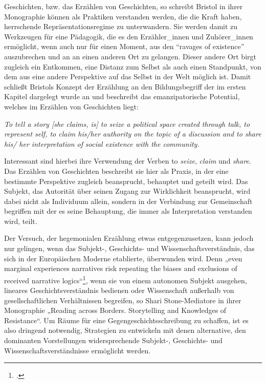   Geschichten, bzw. das Erzählen von Geschichten, so schreibt Bristol in ihrer
  Monographie können als Praktiken verstanden werden, die die Kraft haben,
  herrschende Repräsentationsregime zu unterwandern. Sie werden damit zu
  Werkzeugen für eine Pädagogik, die es den Erzähler\_innen und Zuhörer\_innen
  ermöglicht, wenn auch nur für einen Moment, aus den “ravages of
  existence”\footnotemark {}
  auszubrechen und an an einen anderen Ort zu gelangen. Dieser andere Ort birgt
  zugleich ein Entkommen, eine Distanz zum Selbst  als auch einen Standpunkt,
  von dem aus eine andere Perspektive auf das Selbst in der Welt möglich ist.
  Damit schließt Bristols Konzept der Erzählung an den Bildungsbegriff der im
  ersten Kapitel dargelegt wurde an und beschreibt das emanzipatorische
  Potential, welches im Erzählen von Geschichten liegt:
  \begin{myenv}

\textit{\glqq To tell a story [she claims, is] to seize a political space
  created through talk, to represent self, to claim his/her authority on
  the topic of a discussion and to share his/ her interpretation of social
existence with the community.\grqq \footnotemark {}} 
\end{myenv}

Interessant sind hierbei ihre Verwendung der Verben to \textit{seize},
\textit{claim} und \textit{share}.
Das Erzählen von Geschichten beschreibt sie hier als Praxis, in der eine
bestimmte Perspektive zugleich beansprucht, behauptet und geteilt wird. Das
Subjekt, das Autorität über seinen Zugang zur Wirklichkeit beansprucht, wird
dabei nicht als Individuum allein, sondern in der Verbindung zur Gemeinschaft
begriffen mit der es seine Behauptung, die immer als Interpretation verstanden wird, teilt.

Der Versuch, der hegemonialen Erzählung etwas entgegenzusetzen, kann jedoch nur
gelingen, wenn das Subjekt-, Geschichts- und Wissenschaftsverständnis, das sich
in der Europäischen Moderne etablierte, überwunden wird. Denn „even marginal
experiences narratives risk repeating the biases and exclusions of received
narrative logics“\footnotemark \footcitetext[S. 142]{sstone}, wenn sie von einem autonomen Subjekt ausgehen, lineares
Geschichtsverständnis bedienen oder Wissenschaft außerhalb von
gesellschaftlichen Verhältnissen begreifen, so Shari Stone-Mediatore in ihrer
Monographie „Reading across Borders. Storytelling and Knowledges of
Resistance“\footnotemark {}. Um Räume für eine Gegengeschichtsschreibung zu schaffen, ist es
also dringend notwendig, Strategien zu entwickeln mit denen alternative, den
dominanten Vorstellungen widersprechende Subjekt-, Geschichts- und
Wissenschaftsverständnisse ermöglicht werden.

